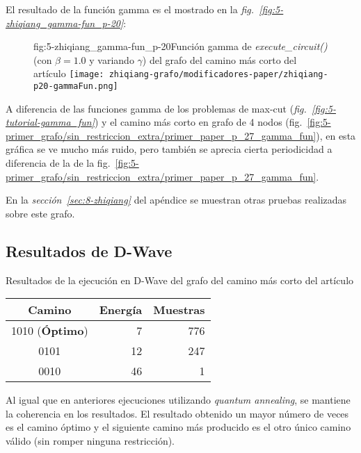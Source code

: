 El resultado de la función gamma es el mostrado en la \textit{fig.~\ref{fig:5-zhiqiang_gamma-fun_p-20}}:

\begin{figure}[Resultados QAOA {--} artículo de Fan \textit{et al.} (2023){--} función gamma para $P = 20$]{fig:5-zhiqiang_gamma-fun_p-20}{Función gamma de \textit{execute\_circuit()} (con $\beta = 1.0$ y variando $\gamma$) del grafo del camino más corto del artículo\cite{solving_shortest_path_with_qaoa}}
  \centering
  \texttt{[image: zhiqiang-grafo/modificadores-paper/zhiqiang-p20-gammaFun.png]}
\end{figure}

A diferencia de las funciones gamma de los problemas de max-cut (\textit{fig.~\ref{fig:5-tutorial-gamma_fun}}) y el camino más corto en grafo de 4 nodos (fig.~\ref{fig:5-primer_grafo/sin_restriccion_extra/primer_paper_p_27_gamma_fun}), en esta gráfica se ve mucho más ruido, pero también se aprecia cierta periodicidad a diferencia de la de la fig.~\ref{fig:5-primer_grafo/sin_restriccion_extra/primer_paper_p_27_gamma_fun}.

En la \textit{sección~\ref{sec:8-zhiqiang}} del apéndice se muestran otras pruebas realizadas sobre este grafo.

\subsection{Resultados de D-Wave}
\begin{table}[Resultados D-Wave {--} artículo de Fan \textit{et al.} (2023)]{}{Resultados de la ejecución en D-Wave del grafo del camino más corto del artículo\cite{solving_shortest_path_with_qaoa}}
  \centering
  \begin{tabular}{|c|r|r|}
    \hline
    \textbf{Camino}        & \textbf{Energía} & \textbf{Muestras} \\ \hline
    1010 (\textbf{Óptimo}) &  7               & 776               \\ \hline
    0101                   & 12               & 247               \\ \hline
    0010                   & 46               &   1               \\ \hline
  \end{tabular}
\end{table}

Al igual que en anteriores ejecuciones utilizando \textit{quantum annealing}, se mantiene la coherencia en los resultados. El resultado obtenido un mayor número de veces es el camino óptimo y el siguiente camino más producido es el otro único camino válido (sin romper ninguna restricción).

